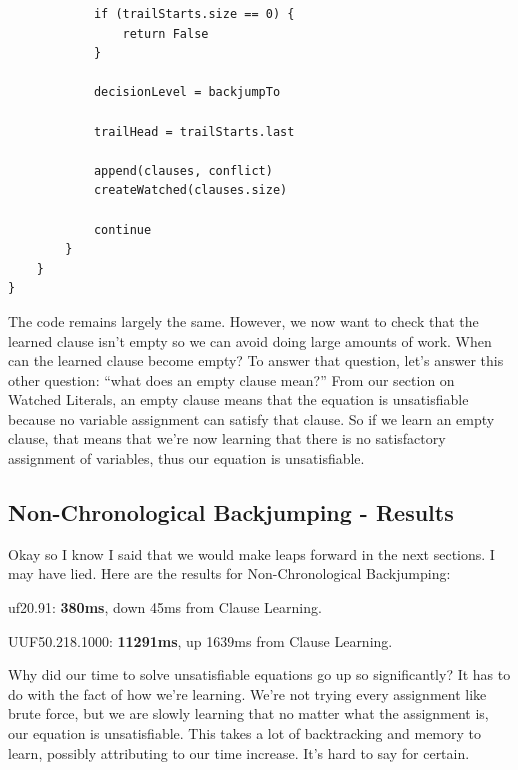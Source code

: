 \documentclass[oneside]{book}
\begin{document}
\begin{lstlisting}
            if (trailStarts.size == 0) {
                return False
            }

            decisionLevel = backjumpTo

            trailHead = trailStarts.last

            append(clauses, conflict)
            createWatched(clauses.size)

            continue
        }
    }
}
\end{lstlisting}

The code remains largely the same. However, we now want to check that the learned clause isn't empty
so we can avoid doing large amounts of work. When can the learned clause become empty? To answer 
that question, let's answer this other question: ``what does an empty clause mean?'' From our 
section on Watched Literals, an empty clause means that the equation is unsatisfiable because 
no variable assignment can satisfy that clause. So if we learn an empty clause, that means that 
we're now learning that there is no satisfactory assignment of variables, thus our equation is 
unsatisfiable.

\subsection{Non-Chronological Backjumping - Results}
Okay so I know I said that we would make leaps forward in the next sections.
I may have lied. Here are the results for Non-Chronological Backjumping:

\noindent
uf20.91: \textbf{380ms}, down 45ms from Clause Learning.

\noindent
UUF50.218.1000: \textbf{11291ms}, up 1639ms from Clause Learning.

Why did our time to solve unsatisfiable equations go up so significantly? It has to do 
with the fact of how we're learning. We're not trying every assignment like brute force, but 
we are slowly learning that no matter what the assignment is, our equation is unsatisfiable. 
This takes a lot of backtracking and memory to learn, possibly attributing to our time increase.
It's hard to say for certain.
\end{document}
